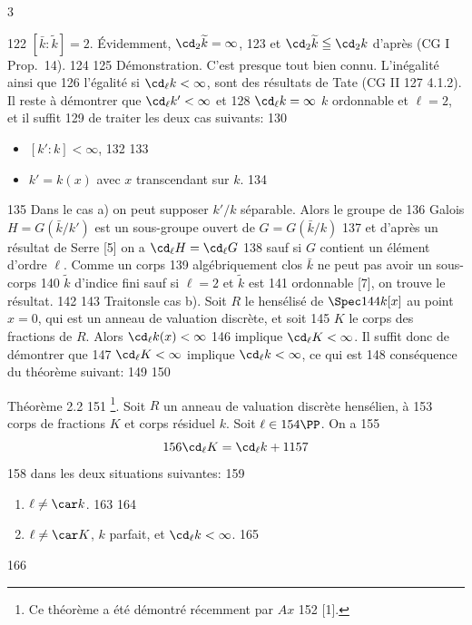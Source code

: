 3	\documentclass[10pt]{../fichiers-configuration-latex/smfart}
\begin{document}
   122	$[\bar{k}:\widetilde{k}]=2$. Évidemment, $\cd_2\widetilde{k}=\infty$,
   123	et $\cd_2\widetilde{k}\leqq \cd_2 k$ d'après (CG I Prop.~14).
   124	
   125	Démonstration. C'est presque tout bien connu. L'inégalité\sisi{}{,} ainsi que
   126	l'égalité si $\cd_{\ell}k<\infty$, sont des résultats de Tate (CG II
   127	4.1.2). Il reste à démontrer que $\cd_{\ell}k'<\infty$ et
   128	$\cd_{\ell}k=\infty$  $k$ ordonnable et $\ell=2$, et il suffit
   129	de traiter les deux cas suivants:
   130	\begin{itemize}
   131	\item[a)] $[k':k]<\infty$,
   132	
   133	\item[b)] $k'=k(x)$ avec $x$ transcendant sur $k$.
   134	\end{itemize}
   135	Dans le cas a) on peut supposer $k'/k$ séparable. Alors le groupe de
   136	Galois $H=G(\bar{k}/k')$ est un sous-groupe ouvert de $G=G(\bar{k}/k)$
   137	et d'après un résultat de Serre [5] on a $\cd_{\ell}H=\cd_{\ell}G$
   138	sauf si $G$ contient un élément d'ordre $\ell$. Comme un corps
   139	algébriquement clos $\bar{k}$ ne peut pas avoir un sous-corps
   140	$\widetilde{k}$ d'indice fini sauf si $\ell=2$ et $\widetilde{k}$ est
   141	ordonnable [7], on trouve le résultat.
   142	
   143	Traitons\pageoriginale le cas b). Soit $R$ le hensélisé de $\Spec
   144	k[x]$ au point $x=0$, qui est un anneau de valuation discrète, et soit
   145	$K$ le corps des fractions de $R$. Alors $\cd_{\ell}k(x)<\infty$
   146	implique $\cd_{\ell}K<\infty$. Il suffit donc de démontrer que
   147	$\cd_{\ell}K<\infty$ implique $\cd_{\ell}k<\infty$, ce qui est
   148	conséquence du théorème suivant:
   149	
   150	\begin{enonce*}{Théorème 2.2}
   151	\footnote{Ce théorème a été démontré récemment par $Ax$
   152	    [1].}. Soit $R$ un anneau de valuation discrète hensélien, à
   153	    corps de fractions $K$ et corps résiduel $k$. Soit $\ell\in
   154	    \PP$. On a
   155	$$
   156	\cd_{\ell}K=\cd_{\ell}k+1
   157	$$
   158	dans les deux situations suivantes:
   159	\begin{enumerate}
   160	\renewcommand{\theenumi}{\roman{enumi}}
   161	\renewcommand{\labelenumi}{(\theenumi)}
   162	\item $\ell\neq \car k$.
   163	
   164	\item $\ell \neq \car K$, $k$ parfait, et $\cd_{\ell}k<\infty$.
   165	\end{enumerate}
   166	\end{enonce*}
\end{document}
